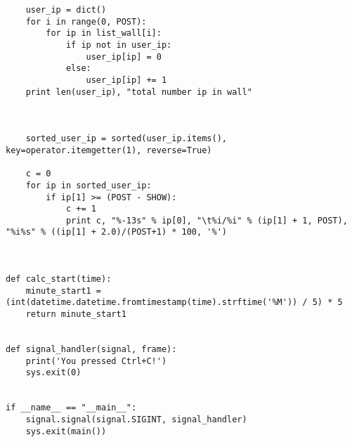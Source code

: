 \begin{lstlisting}
    user_ip = dict()
    for i in range(0, POST):
        for ip in list_wall[i]:
            if ip not in user_ip:
                user_ip[ip] = 0
            else:
                user_ip[ip] += 1
    print len(user_ip), "total number ip in wall"



    sorted_user_ip = sorted(user_ip.items(), key=operator.itemgetter(1), reverse=True)

    c = 0
    for ip in sorted_user_ip:
        if ip[1] >= (POST - SHOW): 
            c += 1
            print c, "%-13s" % ip[0], "\t%i/%i" % (ip[1] + 1, POST), "%i%s" % ((ip[1] + 2.0)/(POST+1) * 100, '%')



def calc_start(time):
    minute_start1 = (int(datetime.datetime.fromtimestamp(time).strftime('%M')) / 5) * 5
    return minute_start1


def signal_handler(signal, frame):
    print('You pressed Ctrl+C!')
    sys.exit(0)


if __name__ == "__main__":
    signal.signal(signal.SIGINT, signal_handler)
    sys.exit(main())
\end{lstlisting}

